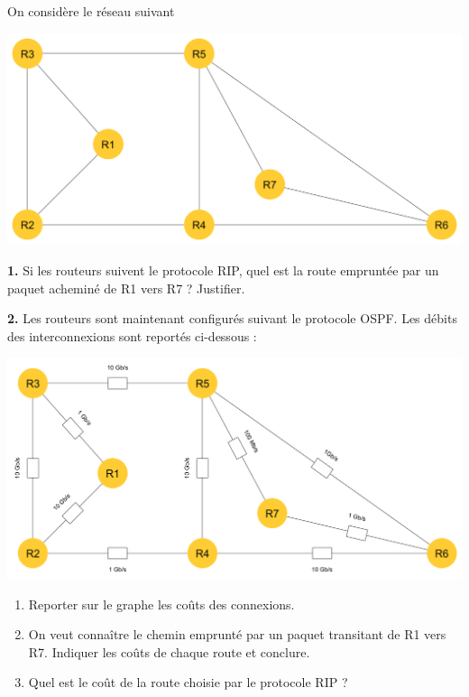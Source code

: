 \documentclass[a4paper,12pt,french]{article}
\begin{document}
\begin{exercice}
On 	considère le réseau suivant 
\begin{center}
\includegraphics[width=14cm]{img/rip}
\end{center}

\textbf{1.} Si les routeurs suivent le protocole RIP, quel est la route empruntée par un paquet acheminé de R1 vers R7 ? Justifier.

\textbf{2.} Les routeurs sont maintenant configurés suivant le protocole OSPF. Les débits des interconnexions sont reportés ci-dessous :
\begin{center}
\includegraphics[width=14cm]{img/ospf}
\end{center}
\begin{enumerate}[\bfseries a.]
\item 	Reporter sur le graphe les coûts des connexions.
\item 	On veut connaître le chemin emprunté par un paquet transitant de R1 vers R7. Indiquer les coûts de chaque route et conclure.

\item Quel est le coût de la route choisie par le protocole RIP ?
\end{enumerate}
\end{exercice}
\end{document}
